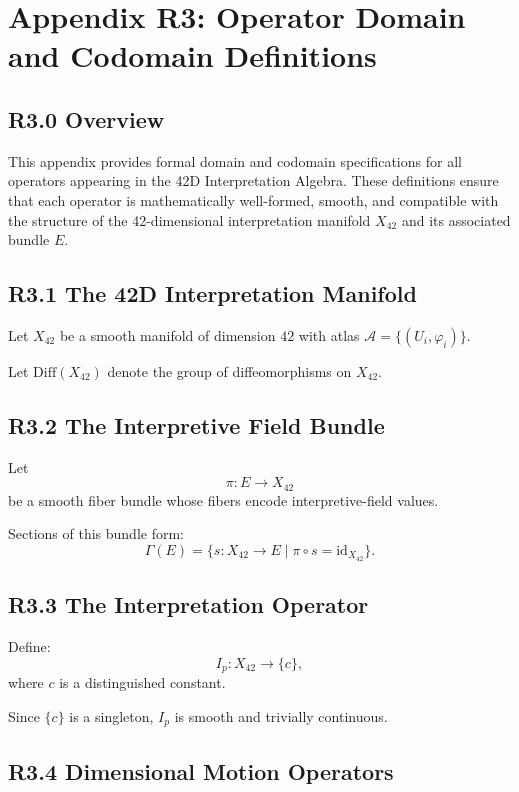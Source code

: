 \appendix
\section*{Appendix R3: Operator Domain and Codomain Definitions}

\subsection*{R3.0 Overview}

This appendix provides formal domain and codomain specifications for all
operators appearing in the 42D Interpretation Algebra. These definitions
ensure that each operator is mathematically well-formed, smooth, and
compatible with the structure of the 42-dimensional interpretation
manifold $X_{42}$ and its associated bundle $E$.

\subsection*{R3.1 The 42D Interpretation Manifold}

Let $X_{42}$ be a smooth manifold of dimension $42$ with atlas
$\mathcal{A} = \{(U_i, \varphi_i)\}$.

Let $\mathrm{Diff}(X_{42})$ denote the group of diffeomorphisms on
$X_{42}$.

\subsection*{R3.2 The Interpretive Field Bundle}

Let
\[
\pi : E \to X_{42}
\]
be a smooth fiber bundle whose fibers encode interpretive-field values.

Sections of this bundle form:
\[
\Gamma(E) = \{ s : X_{42} \to E \mid \pi \circ s = \mathrm{id}_{X_{42}} \}.
\]

\subsection*{R3.3 The Interpretation Operator}

Define:
\[
I_p : X_{42} \to \{c\},
\]
where $c$ is a distinguished constant.

Since $\{c\}$ is a singleton, $I_p$ is smooth and trivially continuous.

\subsection*{R3.4 Dimensional Motion Operators}

